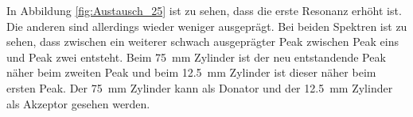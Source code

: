 \FloatBarrier
In Abbildung \ref{fig:Austausch_25} ist zu sehen, dass die erste Resonanz erhöht ist. Die anderen sind allerdings wieder weniger ausgeprägt.
Bei beiden Spektren ist zu sehen, dass zwischen ein weiterer schwach ausgeprägter Peak zwischen Peak eins und Peak zwei entsteht.
Beim \SI{75}{\milli\meter} Zylinder ist der neu entstandende Peak näher beim zweiten Peak und beim \SI{12.5}{\milli\meter} Zylinder
ist dieser näher beim ersten Peak. Der \SI{75}{\milli\meter} Zylinder kann als Donator und der \SI{12.5}{\milli\meter} Zylinder 
als Akzeptor gesehen werden.


